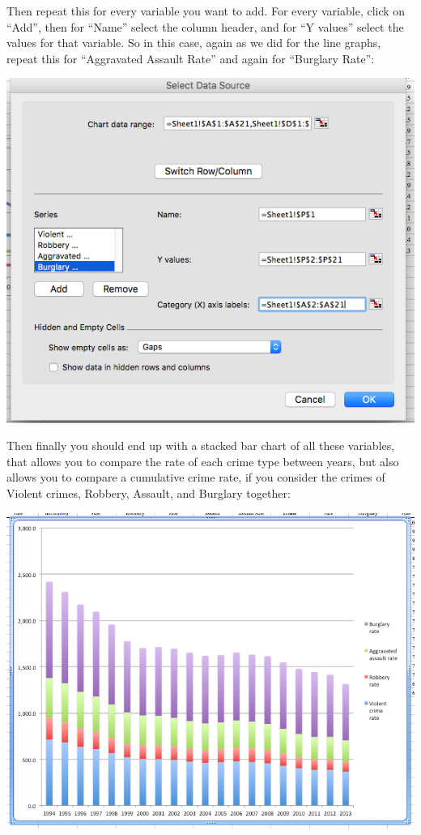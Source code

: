 \documentclass[]{book}
\theoremstyle{definition}
\theoremstyle{definition}
\theoremstyle{definition}
\theoremstyle{remark}
\begin{document}
Then repeat this for every variable you want to add. For every variable,
click on ``Add'', then for ``Name'' select the column header, and for
``Y values'' select the values for that variable. So in this case, again
as we did for the line graphs, repeat this for ``Aggravated Assault
Rate'' and again for ``Burglary Rate'':

\includegraphics{imgs/comp_c_5.png}

Then finally you should end up with a stacked bar chart of all these
variables, that allows you to compare the rate of each crime type
between years, but also allows you to compare a cumulative crime rate,
if you consider the crimes of Violent crimes, Robbery, Assault, and
Burglary together:

\includegraphics{imgs/stackedbar_final.png}
\end{document}
